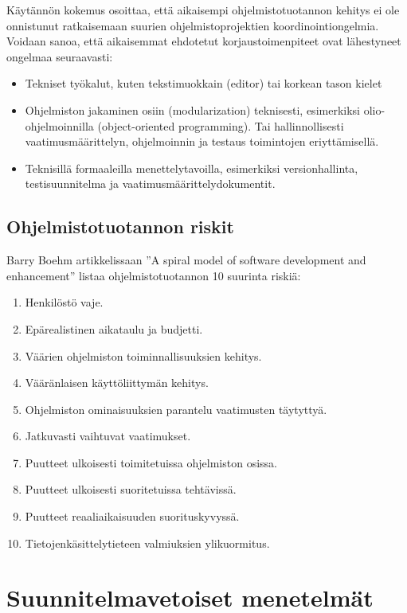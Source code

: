 \documentclass[finnish]{tktltiki2}
\theoremstyle{definition}
\theoremstyle{remark}
\begin{document}
Käytännön kokemus osoittaa, että aikaisempi ohjelmistotuotannon kehitys ei ole onnistunut ratkaisemaan suurien ohjelmistoprojektien koordinointiongelmia. 
Voidaan sanoa, että aikaisemmat ehdotetut korjaustoimenpiteet ovat lähestyneet ongelmaa seuraavasti: 
\begin{itemize}
 \item Tekniset työkalut, kuten tekstimuokkain (editor) tai korkean tason kielet
 \item Ohjelmiston jakaminen osiin (modularization) teknisesti, esimerkiksi olio-ohjelmoinnilla (object-oriented programming). Tai hallinnollisesti vaatimusmäärittelyn, ohjelmoinnin ja testaus toimintojen eriyttämisellä.
 \item Teknisillä formaaleilla menettelytavoilla, esimerkiksi versionhallinta, testisuunnitelma ja vaatimusmäärittelydokumentit\cite{KES95}.
\end{itemize}

\subsection{Ohjelmistotuotannon riskit}

Barry Boehm artikkelissaan ''A spiral model of software development and enhancement'' listaa ohjelmistotuotannon 10 suurinta riskiä: 

\begin{enumerate}
  \item Henkilöstö vaje.
  \item Epärealistinen aikataulu ja budjetti.
  \item Väärien ohjelmiston toiminnallisuuksien kehitys.
  \item Vääränlaisen käyttöliittymän kehitys.
  \item Ohjelmiston ominaisuuksien parantelu vaatimusten täytyttyä.
  \item Jatkuvasti vaihtuvat vaatimukset.
  \item Puutteet ulkoisesti toimitetuissa ohjelmiston osissa.
  \item Puutteet ulkoisesti suoritetuissa tehtävissä.
  \item Puutteet reaaliaikaisuuden suorituskyvyssä.
  \item Tietojenkäsittelytieteen valmiuksien ylikuormitus\cite{BOE88}.
\end{enumerate}

\section{Suunnitelmavetoiset menetelmät}
\end{document}

